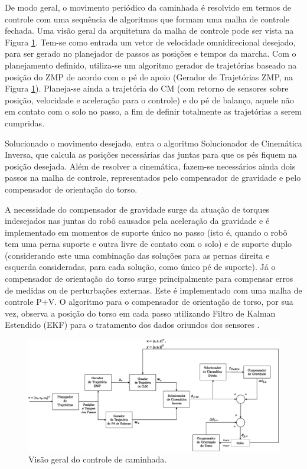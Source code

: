 De modo geral, o movimento periódico da caminhada é resolvido em termos de controle com uma sequência de algoritmos que formam uma malha de controle fechada. Uma visão geral da arquitetura da malha de controle pode ser vista na Figura \ref{FIG: doc manga}. Tem-se como entrada um vetor de velocidade omnidirecional desejado, para ser gerado no planejador de passos as posições e tempos da marcha. Com o planejamento definido, utiliza-se um algoritmo gerador de trajetórias baseado na posição do ZMP de acordo com o pé de apoio (Gerador de Trajetórias ZMP, na Figura \ref{FIG: doc manga}). Planeja-se ainda a trajetória do CM (com retorno de sensores sobre posição, velocidade e aceleração para o controle) e do pé de balanço, aquele não em contato com o solo no passo, a fim de definir totalmente as trajetórias a serem cumpridas.

Solucionado o movimento desejado, entra o algoritmo Solucionador de Cinemática Inversa, que calcula as posições necessárias das juntas para que os pés fiquem na posição desejada. Além de resolver a cinemática, fazem-se necessários ainda dois passos na malha de controle, representados pelo compensador de gravidade e pelo compensador de orientação do torso.

A necessidade do compensador de gravidade surge da atuação de torques indesejados nas juntas do robô causados pela aceleração da gravidade e é implementado em momentos de suporte único no passo (isto é, quando o robô tem uma perna suporte e outra livre de contato com o solo) e de suporte duplo (considerando este uma combinação das soluções para as pernas direita e esquerda consideradas, para cada solução, como único pé de suporte). Já o compensador de orientação do torso surge principalmente para compensar erros de medidas ou de perturbações externas. Este é implementado com uma malha de controle P+V. O algoritmo para o compensador de orientação de torso, por sua vez, observa a posição do torso em cada passo utilizando Filtro de Kalman Estendido (EKF) para o tratamento dos dados oriundos dos sensores \cite{tesemarcos}.
 
\begin{figure} 
	\centering
	\includegraphics[angle=90, scale = 0.75]{walking_engine_overview.eps}
	\caption{Visão geral do controle de caminhada.}
	\label{FIG: doc manga}
\end{figure} 
 

